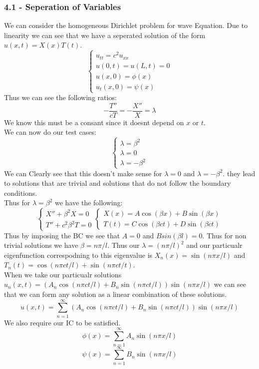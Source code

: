 \documentclass[answers,12pt,addpoints]{exam}
\begin{document}
\subsubsection{4.1 - Seperation of Variables}
\begin{definition}
    We can consider the homogeneous Dirichlet problem for wave Equation.
    Due to linearity we can see that we have a seperated solution of the form $u(x,t) = X(x)T(t)$.\\
    $$ \begin{cases}
        u_{tt} = c^2 u_{xx} \\
        u(0,t) = u(L,t) = 0 \\
        u(x,0) = \phi(x) \\
        u_t(x,0) = \psi(x)
    \end{cases}$$
    Thus we can see the following ratios:
    $$ -\frac{T''}{cT} = -\frac{X''}{X} = \lambda$$
    We know this must be a consant since it doesnt depend on $x$ or $t$.\\
    We can now do our test cases: \\
    $$\begin{cases}
        \lambda = \beta^2 \\
        \lambda = 0 \\
        \lambda = -\beta^2
    \end{cases}
    $$
    We can Clearly see that this doesn't make sense for $\lambda = 0$ and $\lambda = -\beta^2$. they lead to solutions that are trivial and solutions that do not follow the boundary conditions.\\
    Thus for $\lambda = \beta^2$ we have the following:
    $$\begin{cases}
        X'' + \beta^2 X = 0 \\
        T'' + c^2\beta^2 T = 0
    \end{cases}
    \begin{cases}
        X(x) = A \cos(\beta x) + B \sin(\beta x) \\
        T(t) = C \cos(\beta ct) + D \sin(\beta ct)
    \end{cases}
    $$
    Thus by imposing the BC we see that $A = 0$ and $B sin(\beta l) = 0$. Thus for non trivial solutions we have $\beta = n\pi/l$.
    Thus our $\lambda = (n\pi/l)^2$ and our particualr eigenfunction correspodning to this eigenvalue is $X_n(x) = \sin(n\pi x/l)$ and $T_n(t) = \cos(n\pi ct/l) + \sin(n \pi ct/t)$.\\
    When we take our particualr solutions $u_n(x,t) = (A_n \cos(n\pi ct/l) + B_n \sin(n\pi ct/l)) \sin(n\pi x/l)$ we can see that we can form any solution as a linear combination of these solutions.
    $$ u(x,t) = \sum_{n=1}^\infty (A_n \cos(n\pi ct/l) + B_n \sin(n\pi ct/l)) \sin(n\pi x/l)$$
    We also require our IC to be satisfied. 
    $$ \phi(x) = \sum_{n=1}^\infty A_n \sin(n\pi x/l)$$
    $$ \psi(x) = \sum_{n=1}^\infty B_n \sin(n\pi x/l)$$
\end{definition}
\end{document}
